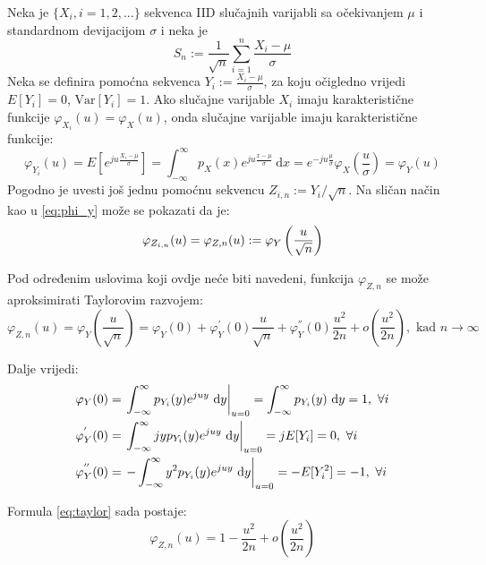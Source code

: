 Neka je $\{X_i, i=1,2,...\}$ sekvenca IID slučajnih varijabli sa očekivanjem
$\mu$ i standardnom devijacijom $\sigma$ i neka je
\begin{equation}
  S_n := \frac{1}{\sqrt{n}} \sum_{i=1}^{n} \frac{X_i-\mu}{\sigma}
\end{equation}
Neka se definira pomoćna sekvenca $Y_i := \frac{X_i-\mu}{\sigma}$, za koju
očigledno vrijedi $E[Y_i] = 0$, $\text{Var}[Y_i] = 1$. Ako slučajne varijable
$X_i$ imaju karakteristične funkcije $\varphi_{X_i}(u) = \varphi_X(u)$, onda
slučajne varijable imaju karakteristične funkcije:
\begin{equation} \label{eq:phi_y}
  \varphi_{Y_i}(u) = E\left[e^{ju\frac{X_i-\mu}{\sigma}}\right]
  = \int_{-\infty}^{\infty} p_X(x)e^{ju\frac{x-\mu}{\sigma}} \ \mathrm dx
  = e^{-ju\frac{\mu}{\sigma}} \varphi_X\left(\frac{u}{\sigma}\right)
  = \varphi_Y(u)
\end{equation}
Pogodno je uvesti još jednu pomoćnu sekvencu $Z_{i,n} := Y_i/\sqrt{n}$. Na
sličan način kao u \eqref{eq:phi_y} može se pokazati da je:
\begin{equation}
  \varphi_{Z_{i,n}}(u) = \varphi_{Z,n}(u) := \varphi_Y\left(u\over\sqrt{n}\right)
\end{equation}


Pod određenim uslovima koji ovdje neće biti navedeni, funkcija $\varphi_{Z,n}$
se može aproksimirati Taylorovim razvojem:
\begin{equation} \label{eq:taylor}
  \varphi_{Z,n}(u) = \varphi_Y\left(\frac{u}{\sqrt{n}}\right) 
  = \varphi_Y(0) + \varphi_Y^{'}(0)\frac{u}{\sqrt{n}}
  + \varphi_Y^{''}(0)\frac{u^2}{2n} + o\left(\frac{u^2}{2n}\right),
    \text{ kad } n\to\infty
\end{equation}

Dalje vrijedi:
\begin{align*}
  \varphi_Y(0)
    &= \left.\int_{-\infty}^{\infty} p_{Y_i}(y) e^{juy} \ \text dy\right|_{u=0}
    = \int_{-\infty}^{\infty} p_{Y_i}(y) \ \text dy = 1,\  \forall i \\
  \varphi_Y^{'}(0)
    &= \left.\int_{-\infty}^{\infty} jyp_{Y_i}(y)e^{juy} \ \text dy \right|_{u=0}
    = jE[Y_i] = 0,\ \forall i \\
  \varphi_Y^{''}(0)
    &= \left.-\int_{-\infty}^{\infty} y^2 p_{Y_i}(y)e^{juy} \ \text dy\right|_{u=0}
    = -E[Y_i^2] = -1,\ \forall i
\end{align*}

Formula \eqref{eq:taylor} sada postaje:
\begin{equation}
  \varphi_{Z,n}(u) = 1 - \frac{u^2}{2n} + o\left(\frac{u^2}{2n}\right)
\end{equation}

